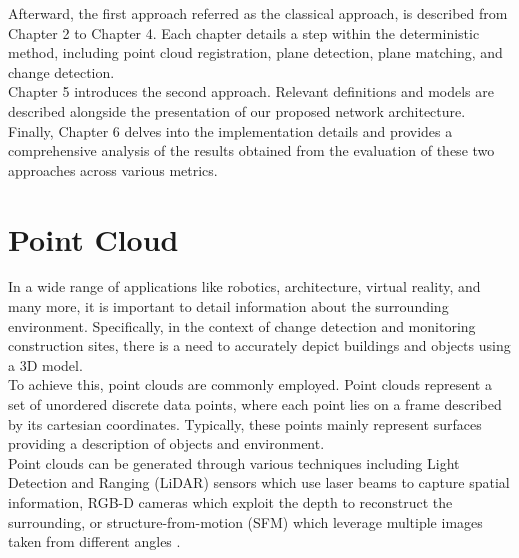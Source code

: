 Afterward, the first approach referred as the classical approach, is described from Chapter 2 to Chapter 4. Each chapter details a step within the deterministic method, including point cloud registration, plane detection, plane matching, and change detection.\\

Chapter 5 introduces the second approach. Relevant definitions and models are described alongside the presentation of our proposed network architecture.\\

Finally, Chapter 6 delves into the implementation details and provides a comprehensive analysis of the results obtained from the evaluation of these two approaches across various metrics.

\section{Point Cloud}
In a wide range of applications like robotics, architecture, virtual reality, and many more, it is important to detail information about the surrounding environment. Specifically, in the context of change detection and monitoring construction sites, there is a need to accurately depict buildings and objects using a 3D model.\\

To achieve this, point clouds are commonly employed. Point clouds represent a set of unordered discrete data points, where each point lies on a frame described by its cartesian coordinates. Typically, these points mainly represent surfaces providing a description of objects and environment.\\

Point clouds can be generated through various techniques including Light Detection and Ranging (LiDAR) sensors which use laser beams to capture spatial information, RGB-D cameras which exploit the depth to reconstruct the surrounding, or structure-from-motion (SFM) which leverage multiple images taken from different angles \cite{pcdAcquisition}.


